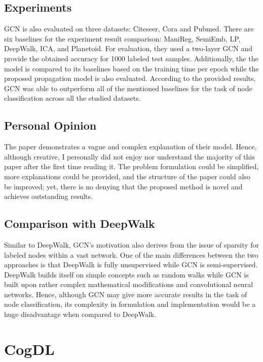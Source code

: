 \documentclass[12pt,a4paper]{article}
\begin{document}
	\subsection{Experiments}
	\noindent GCN is also evaluated on three datasets: Citeseer, Cora and Pubmed. There are six baselines for the experiment result comparison: ManiReg, SemiEmb, LP, DeepWalk, ICA, and Planetoid. For evaluation, they used a two-layer GCN and provide the obtained accuracy for 1000 labeled test samples. Additionally, the the model is compared to its baselines based on the training time per epoch while the proposed propagation model is also evaluated. According to the provided results, GCN was able to outperform all of the mentioned baselines for the task of node classification across all the studied datasets.
	
	
	\vspace{-0.3cm}
	\subsection{Personal Opinion}
	\noindent The paper demonstrates a vague and complex explanation of their model. Hence, although creative, I personally did not enjoy nor understand the majority of this paper after the first time reading it. The problem formulation could be simplified, more explanations could be provided, and the structure of the paper could also be improved; yet, there is no denying that the proposed method is novel and achieves outstanding results.
	
	\vspace{-0.3cm}
	\subsection{Comparison with DeepWalk}
	\noindent Similar to DeepWalk, GCN's motivation also derives from the issue of sparsity for labeled nodes within a vast network. One of the main differences between the two approaches is that DeepWalk is fully unsupervised while GCN is semi-supervised. DeepWalk builds itself on simple concepts such as random walks while GCN is built upon rather complex mathematical modifications and convolutional neural networks. Hence, although GCN may give more accurate results in the task of node classification, its complexity in formulation and implementation would be a huge disadvantage when compared to DeepWalk.
	
	\section{CogDL}
	
\end{document}
